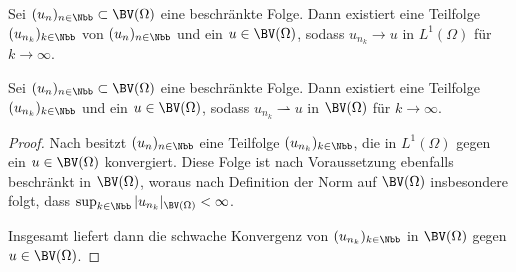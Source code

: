 \begin{theorem}
  \label{thm:l1ConvergentSubsequence}
  Sei $(u_n)_{n\in\Nbb}\subset \BV(\Omega)$ eine beschränkte Folge. Dann 
  existiert eine Teilfolge $(u_{n_k})_{k\in\Nbb}$ von
  $(u_n)_{n\in\Nbb}$ und ein $u\in\BV(\Omega)$, sodass
  $u_{n_k}\to u$ in $L^1(\Omega)$ für $k\to \infty$.
\end{theorem}

\begin{theorem}
  \label{thm:compactness}
  Sei $(u_n)_{n\in\Nbb}\subset \BV(\Omega)$ eine beschränkte Folge. Dann 
  existiert eine Teilfolge $(u_{n_k})_{k\in\Nbb}$ und ein $u\in\BV(\Omega)$,
  sodass $u_{n_k}\rightharpoonup u$ in $\BV(\Omega)$ für $k\rightarrow\infty$.
\end{theorem}

\begin{proof}
  Nach  besitzt $(u_n)_{n\in\Nbb}$ eine
  Teilfolge $(u_{n_k})_{k\in\Nbb}$, die in $L^1(\Omega)$ gegen ein
  $u\in\BV(\Omega)$ konvergiert.
  Diese Folge ist nach Voraussetzung ebenfalls beschränkt in 
  $\BV(\Omega)$, woraus nach Definition der Norm auf $\BV(\Omega)$ insbesondere
  folgt, dass
  $\sup_{k\in\Nbb}|u_{n_k}|_{\BV(\Omega)}< \infty$. 
  
  Insgesamt liefert  dann die schwache Konvergenz von
  $(u_{n_k})_{k\in\Nbb}$ in $\BV(\Omega)$ gegen $u\in\BV(\Omega)$.
\end{proof}

%

